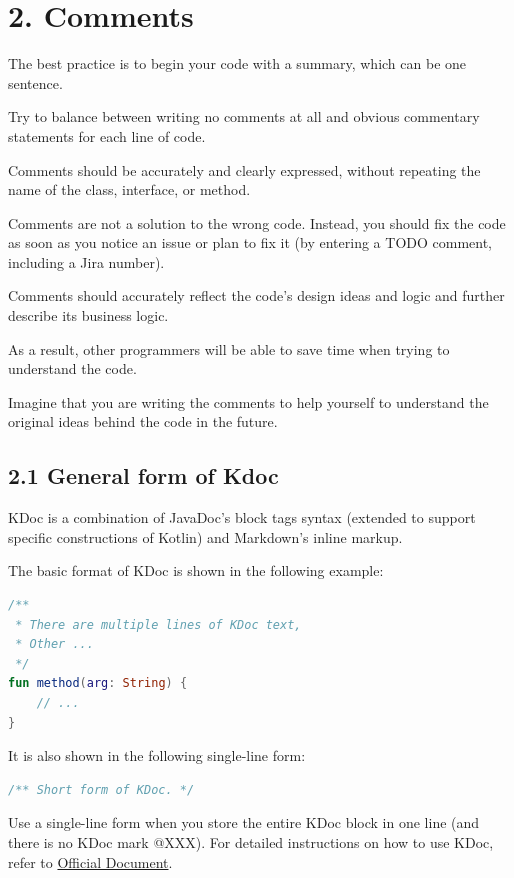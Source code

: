 \section*{\textbf{2. Comments}}

\label{sec:2.}



The best practice is to begin your code with a summary, which can be one sentence.

Try to balance between writing no comments at all and obvious commentary statements for each line of code.

Comments should be accurately and clearly expressed, without repeating the name of the class, interface, or method.

Comments are not a solution to the wrong code. Instead, you should fix the code as soon as you notice an issue or plan to fix it (by entering a TODO comment, including a Jira number).

Comments should accurately reflect the code's design ideas and logic and further describe its business logic.

As a result, other programmers will be able to save time when trying to understand the code.

Imagine that you are writing the comments to help yourself to understand the original ideas behind the code in the future. 



\subsection*{\textbf{2.1 General form of Kdoc}}

\label{sec:2.1}



KDoc is a combination of JavaDoc's block tags syntax (extended to support specific constructions of Kotlin) and Markdown's inline markup.

The basic format of KDoc is shown in the following example:



\begin{lstlisting}[language=Kotlin]
 /**
 * There are multiple lines of KDoc text,
 * Other ...
 */
fun method(arg: String) {
    // ...
}
\end{lstlisting}


It is also shown in the following single-line form:



\begin{lstlisting}[language=Kotlin]
 /** Short form of KDoc. */
\end{lstlisting}
Use a single-line form when you store the entire KDoc block in one line (and there is no KDoc mark @XXX). For detailed instructions on how to use KDoc, refer to \href{https://docs.oracle.com/en/Kotlin/Kotlinse/11/tools/KDoc.html}{Official Document}.



